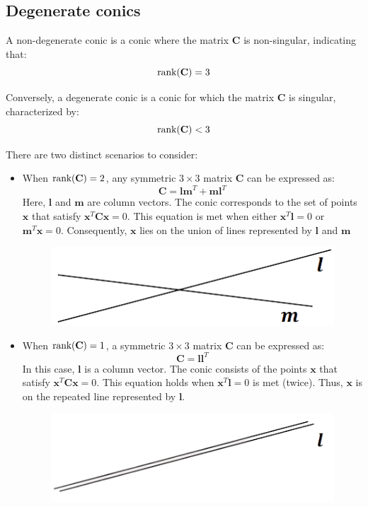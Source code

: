 \subsection{Degenerate conics}
\begin{definition}
    A non-degenerate conic is a conic where the matrix $\mathbf{C}$ is non-singular, indicating that: 
    \[\textnormal{rank}(\mathbf{C})=3\]
\end{definition}
\begin{definition}
    Conversely, a degenerate conic is a conic  for which the matrix $\mathbf{C}$ is singular, characterized by: 
    \[\textnormal{rank}(\mathbf{C}) < 3\]
\end{definition}
There are two distinct scenarios to consider:
\begin{itemize}
    \item When $\textnormal{rank}(\mathbf{C}) = 2$, any symmetric $3 \times 3$ matrix $\mathbf{C}$ can be expressed as:
        \[\mathbf{C}=\mathbf{lm}^T+\mathbf{ml}^T\]
        Here, $\mathbf{l}$ and $\mathbf{m}$ are column vectors. 
        The conic corresponds to the set of points $\mathbf{x}$  that satisfy $\mathbf{x}^T\mathbf{Cx}=0$.
        This equation is met when either $\mathbf{x}^T\mathbf{l}=0$ or $\mathbf{m}^T\mathbf{x}=0$. 
        Consequently, $\mathbf{x}$ lies on the union of lines represented by $\mathbf{l}$ and $\mathbf{m}$
        \begin{figure}[H]
            \centering
            \includegraphics[width=0.25\linewidth]{images/inters.png}
        \end{figure}
    \item When $\textnormal{rank}(\mathbf{C}) = 1$, a symmetric $3 \times 3$ matrix $\mathbf{C}$ can be expressed as:
        \[\mathbf{C}=\mathbf{ll}^T\]
        In this case, $\mathbf{l}$ is a column vector. 
        The conic consists of the points $\mathbf{x}$ that satisfy $\mathbf{x}^T\mathbf{Cx}=0$.
        This equation holds  when $\mathbf{x}^T\mathbf{l}=0$ is met (twice). 
        Thus, $\mathbf{x}$ is on the repeated line represented by $\mathbf{l}$.
        \begin{figure}[H]
            \centering
            \includegraphics[width=0.25\linewidth]{images/rep.png}
        \end{figure}
\end{itemize}